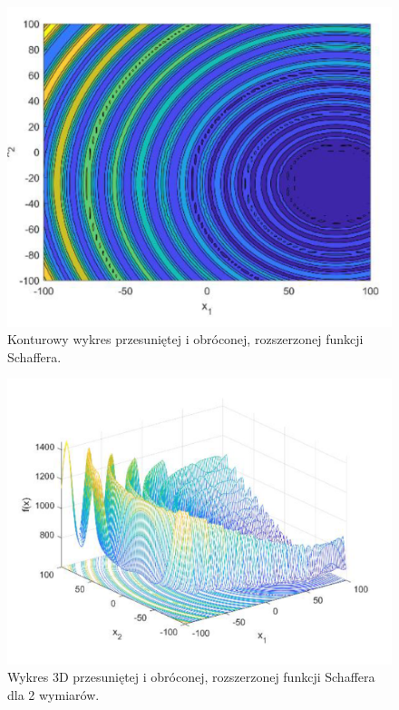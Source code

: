\documentclass[10pt]{article}
\begin{document}
\begin{figure}[H]
\centering
\includegraphics[scale=1]{images/ContourSchaffer.png}
\caption{Konturowy wykres przesuniętej i obróconej, rozszerzonej funkcji Schaffera.}
\end{figure}
\begin{figure}[H]
\centering
\includegraphics[scale=1]{images/Wykres3DSchaffer.png}
\caption{Wykres 3D przesuniętej i obróconej, rozszerzonej funkcji Schaffera dla 2 wymiarów.}
\end{figure}
\end{document}
